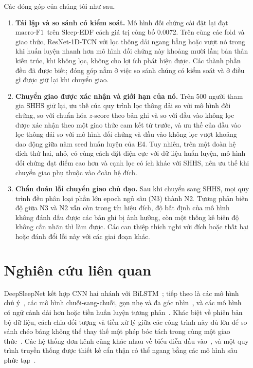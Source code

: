 \documentclass[11pt,a4paper]{article}
\newcommand{\mf}{\ensuremath{\mathrm{macro\text{-}F1}}}
\begin{document}
Các đóng góp của chúng tôi như sau.
\begin{enumerate}[label=(\arabic*)]
\item \textbf{Tái lập và so sánh có kiểm soát.} Mô hình đối chứng cài đặt lại đạt \mf\ trên Sleep-EDF cách
giá trị công bố 0.0072. Trên cùng các fold và giao thức, ResNet-1D-TCN với lọc thông dải ngang bằng hoặc vượt
nó trong khi huấn luyện nhanh hơn mô hình đối chứng này khoảng mười lần; bản thân kiến trúc, khi không lọc,
không cho lợi ích phát hiện được. Các thành phần đều đã được biết; đóng góp nằm ở việc so sánh chúng có kiểm
soát và ở điều gì được giữ lại khi chuyển giao.
\item \textbf{Chuyển giao được xác nhận và giới hạn của nó.} Trên 500 người tham gia SHHS giữ lại, ưu thế của
quy trình lọc thông dải so với mô hình đối chứng, so với chuẩn hóa $z$-score theo bản ghi và so với đầu vào
không lọc được xác nhận theo một giao thức cam kết từ trước, và ưu thế của đầu vào lọc thông dải so với mô hình
đối chứng và đầu vào không lọc vượt khoảng dao động giữa năm seed huấn luyện của E4. Tuy nhiên, trên một đoàn
hệ đích thứ hai, nhỏ, có cùng cách đặt điện cực với dữ liệu huấn luyện, mô hình đối chứng đạt điểm cao hơn và
cạnh lọc có ích khác với SHHS, nên ưu thế khi chuyển giao phụ thuộc vào đoàn hệ đích.
\item \textbf{Chẩn đoán lỗi chuyển giao chủ đạo.} Sau khi chuyển sang SHHS, mọi quy trình đều phân loại phần
lớn epoch ngủ sâu (N3) thành N2. Tương phản biên độ giữa N3 và N2 vẫn còn trong tín hiệu đích, độ bất định
của mô hình không đánh dấu được các bản ghi bị ảnh hưởng, còn một thống kê biên độ không cần nhãn thì làm
được. Các can thiệp thích nghi với đích hoặc thất bại hoặc đánh đổi lỗi này với các giai đoạn khác.
\end{enumerate}

\section{Nghiên cứu liên quan}

DeepSleepNet kết hợp CNN hai nhánh với BiLSTM~\cite{supratak2017deepsleepnet}; tiếp theo là các mô hình chú
ý~\cite{eldele2021attnsleep,phan2022sleeptransformer}, các mô hình chuỗi-sang-chuỗi, gọn nhẹ và đa
góc nhìn~\cite{phan2019seqsleepnet,supratak2020tinysleepnet,phan2022xsleepnet}, và các mô hình có ngữ cảnh dài
hơn hoặc tiền huấn luyện tương phản~\cite{phan2023lseqsleepnet,lee2024sleepyco}. Khác biệt về phiên bản bộ dữ
liệu, cách chia đối tượng và tiền xử lý giữa các công trình này đủ lớn để so sánh chéo bảng không thể thay thế
một phép bóc tách trong cùng một giao thức~\cite{phan2022review}. Các hệ thống đơn kênh cũng khác nhau về biểu
diễn đầu vào~\cite{haghayegh2023sleepinceptionnet}, và một quy trình truyền thống được thiết kế cẩn thận có thể
ngang bằng các mô hình sâu phức tạp~\cite{vdd2023traditional}.
\end{document}
